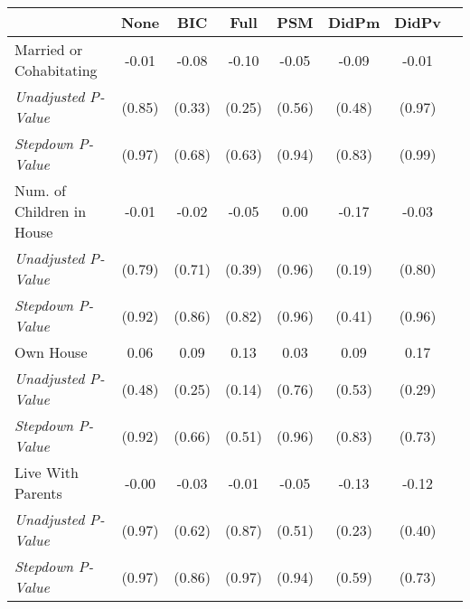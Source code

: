 \begin{tabular}{l c c c c c c c}
\toprule
 & None & BIC & Full & PSM & DidPm & DidPv \\
\midrule
Married or Cohabitating & -0.01 & -0.08 & -0.10 & -0.05 & -0.09 & -0.01 \\
\quad \textit{Unadjusted P-Value} & (0.85) & (0.33) & (0.25) & (0.56) & (0.48) & (0.97) \\
\quad \textit{Stepdown P-Value} & (0.97) & (0.68) & (0.63) & (0.94) & (0.83) & (0.99) \\
Num. of Children in House & -0.01 & -0.02 & -0.05 & 0.00 & -0.17 & -0.03 \\
\quad \textit{Unadjusted P-Value} & (0.79) & (0.71) & (0.39) & (0.96) & (0.19) & (0.80) \\
\quad \textit{Stepdown P-Value} & (0.92) & (0.86) & (0.82) & (0.96) & (0.41) & (0.96) \\
Own House & 0.06 & 0.09 & 0.13 & 0.03 & 0.09 & 0.17 \\
\quad \textit{Unadjusted P-Value} & (0.48) & (0.25) & (0.14) & (0.76) & (0.53) & (0.29) \\
\quad \textit{Stepdown P-Value} & (0.92) & (0.66) & (0.51) & (0.96) & (0.83) & (0.73) \\
Live With Parents & -0.00 & -0.03 & -0.01 & -0.05 & -0.13 & -0.12 \\
\quad \textit{Unadjusted P-Value} & (0.97) & (0.62) & (0.87) & (0.51) & (0.23) & (0.40) \\
\quad \textit{Stepdown P-Value} & (0.97) & (0.86) & (0.97) & (0.94) & (0.59) & (0.73) \\
\bottomrule
\end{tabular}
